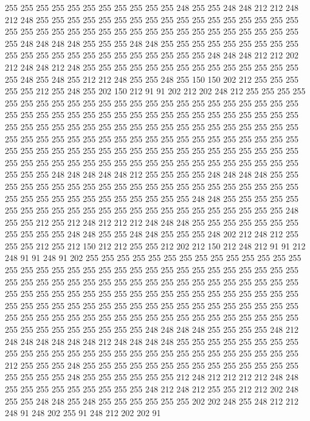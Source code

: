 255 255 255 255 255 255 255 255 255 255 255 248 255 255 248 248 212 212 248 212
248 255 255 255 255 255 255 255 255 255 255 255 255 255 255 255 255 255 255 255
255 255 255 255 255 255 255 255 255 255 255 255 255 255 255 255 255 255 248 248
248 248 255 255 255 248 248 255 255 255 255 255 255 255 255 255 255 255 255 255
255 255 255 255 255 255 255 255 255 248 248 248 212 212 202 212 248 248 212 248
255 255 255 255 255 255 255 255 255 255 255 255 255 255 255 248 255 248 255 212
212 248 255 255 248 255 150 150 202 212 255 255 255 255 255 212 255 248 255 202
150 212 91 91 202 212 202 248 212 255 255 255 255 255 255 255 255 255 255 255
255 255 255 255 255 255 255 255 255 255 255 255 255 255 255 255 255 255 255 255
255 255 255 255 255 255 255 255 255 255 255 255 255 255 255 255 255 255 255 255
255 255 255 255 255 255 255 255 255 255 255 255 255 255 255 255 255 255 255 255
255 255 255 255 255 255 255 255 255 255 255 255 255 255 255 255 255 255 255 255
255 255 255 255 255 255 255 255 255 255 255 255 255 255 255 255 255 255 255 255
255 255 255 255 255 255 255 255 255 255 248 248 248 248 248 212 255 255 255 255
248 248 248 248 255 255 255 255 255 255 255 255 255 255 255 255 255 255 255 255
255 255 255 255 255 255 255 255 255 255 255 255 255 255 255 255 255 248 248 255
255 255 255 255 255 255 255 255 255 255 255 255 255 255 255 255 255 255 255 255
255 255 248 255 255 212 255 212 248 212 212 212 248 248 248 255 255 255 255 255
255 255 255 255 255 255 248 248 255 255 248 248 255 255 255 248 202 212 248 212
255 255 255 212 255 212 150 212 212 255 255 212 202 212 150 212 248 212 91 91
212 248 91 91 248 91 202 255 255 255 255 255 255 255 255 255 255 255 255 255
255 255 255 255 255 255 255 255 255 255 255 255 255 255 255 255 255 255 255 255
255 255 255 255 255 255 255 255 255 255 255 255 255 255 255 255 255 255 255 255
255 255 255 255 255 255 255 255 255 255 255 255 255 255 255 255 255 255 255 255
255 255 255 255 255 255 255 255 255 255 255 255 255 255 255 255 255 255 255 255
255 255 255 255 255 255 255 255 255 255 255 255 255 255 255 255 255 255 255 255
255 255 255 255 255 248 248 248 248 255 255 255 255 248 212 248 248 248 248 248
248 212 248 248 248 248 255 255 255 255 255 255 255 255 255 255 255 255 255 255
255 255 255 255 255 255 255 255 255 255 255 255 255 212 255 255 255 248 255 255
255 255 255 255 255 255 255 255 255 255 255 255 255 255 255 255 248 255 255 255
255 255 255 212 248 212 212 212 212 248 248 255 255 255 255 255 255 255 255 255
248 212 248 212 255 255 212 212 202 248 255 255 248 248 255 248 255 255 255 255
255 255 202 202 248 255 248 212 212 248 91 248 202 255 91 248 212 202 202 91
